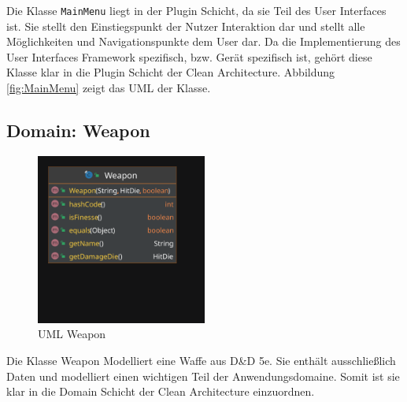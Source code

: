 Die Klasse \texttt{MainMenu} liegt in der Plugin Schicht, da sie Teil des User Interfaces ist. Sie stellt den Einstiegspunkt der Nutzer Interaktion dar und stellt alle Möglichkeiten und Navigationspunkte dem User dar. Da die Implementierung des User Interfaces Framework spezifisch, bzw. Gerät spezifisch ist, gehört diese Klasse klar in die Plugin Schicht der Clean Architecture. Abbildung \ref{fig:MainMenu} zeigt das UML der Klasse.

\subsection{Domain: Weapon}
\begin{figure}[H]
	\centering
	\includegraphics[width=0.5\textwidth]{Bilder/Weapon.pdf}
	\caption{UML Weapon}
	\label{fig:Weapon}
\end{figure}
Die Klasse Weapon Modelliert eine Waffe aus D\&D 5e. Sie enthält ausschließlich Daten und modelliert einen wichtigen Teil der Anwendungsdomaine. Somit ist sie klar in die Domain Schicht der Clean Architecture einzuordnen.
